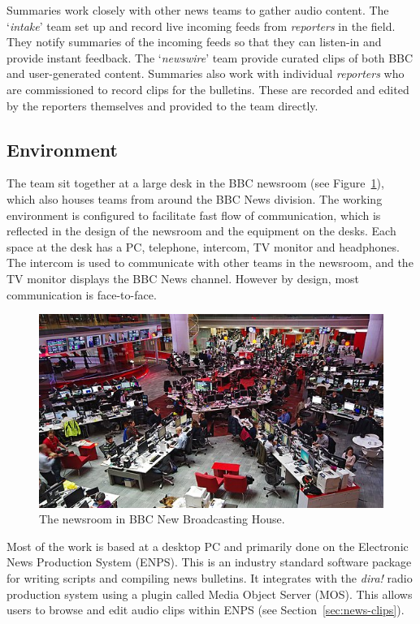 Summaries work closely with other news teams to gather audio content. The
`\textit{intake}' team set up and record live incoming feeds from
\textit{reporters} in the field. They notify summaries of the incoming feeds so
that they can listen-in and provide instant feedback. The `\textit{newswire}'
team provide curated clips of both BBC and user-generated content. Summaries
also work with individual \textit{reporters} who are commissioned to record
clips for the bulletins. These are recorded and edited by the reporters
themselves and provided to the team directly.

\subsection{Environment}
The team sit together at a large desk in the BBC newsroom (see
Figure~\ref{fig:newsroom}), which also houses teams from around the BBC News
division.  The working environment is configured to facilitate fast flow of
communication, which is reflected in the design of the newsroom and the
equipment on the desks.  Each space at the desk has a PC, telephone, intercom,
TV monitor and headphones. The intercom is used to communicate with other teams
in the newsroom, and the TV monitor displays the BBC News channel. However by
design, most communication is face-to-face.

\begin{figure}[ht]
  \centering
  \includegraphics[width=\columnwidth]{figs/newsroom.jpg}
  \caption{The newsroom in BBC New Broadcasting House.}
  \label{fig:newsroom}
\end{figure}

Most of the work is based at a desktop PC and primarily done on the Electronic
News Production System (ENPS). This is an industry standard software package
for writing scripts and compiling news bulletins. It integrates with the
\textit{dira!} radio production system using a plugin called Media Object
Server (MOS). This allows users to browse and edit audio clips within ENPS (see
Section~\ref{sec:news-clips}).

